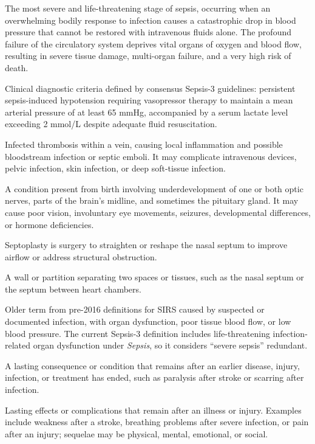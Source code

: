  The most severe and life-threatening stage of sepsis, occurring when an overwhelming bodily response to infection causes a catastrophic drop in blood pressure that cannot be restored with intravenous fluids alone. The profound failure of the circulatory system deprives vital organs of oxygen and blood flow, resulting in severe tissue damage, multi-organ failure, and a very high risk of death.

 Clinical diagnostic criteria defined by consensus Sepsis-3 guidelines: persistent sepsis-induced hypotension requiring vasopressor therapy to maintain a mean arterial pressure of at least 65 mmHg, accompanied by a serum lactate level exceeding 2 mmol/L despite adequate fluid resuscitation.

 Infected thrombosis within a vein, causing local inflammation and possible bloodstream infection or septic emboli. It may complicate intravenous devices, pelvic infection, skin infection, or deep soft-tissue infection.

 A condition present from birth involving underdevelopment of one or both optic nerves, parts of the brain’s midline, and sometimes the pituitary gland. It may cause poor vision, involuntary eye movements, seizures, developmental differences, or hormone deficiencies.

 Septoplasty is surgery to straighten or reshape the nasal septum to improve airflow or address structural obstruction.

 A wall or partition separating two spaces or tissues, such as the nasal septum or the septum between heart chambers.

 Older term from pre-2016 definitions for SIRS caused by suspected or
documented infection, with organ dysfunction, poor tissue blood flow, or low blood pressure. The
current Sepsis-3 definition includes life-threatening infection-related organ dysfunction under
\textit{Sepsis}, so it considers “severe sepsis” redundant.

 A lasting consequence or condition that remains after an earlier disease, injury, infection, or treatment has ended, such as paralysis after stroke or scarring after infection.

 Lasting effects or complications that remain after an illness or injury. Examples include weakness after a stroke, breathing problems after severe infection, or pain after an injury; sequelae may be physical, mental, emotional, or social.

